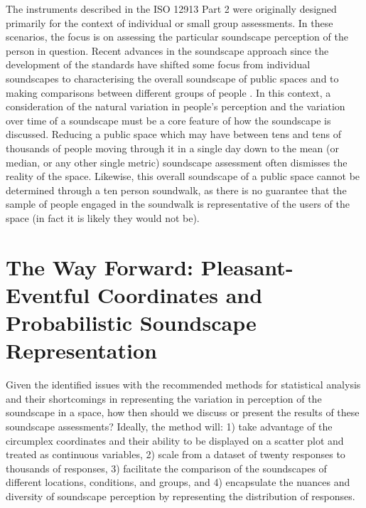 \documentclass[
  authoryear,
  preprint,
  3p]{elsarticle}
\begin{document}
The instruments described in the ISO 12913 Part 2 \citep{ISO12913_2}
were originally designed primarily for the context of individual or
small group assessments. In these scenarios, the focus is on assessing
the particular soundscape perception of the person in question. Recent
advances in the soundscape approach since the development of the
standards have shifted some focus from individual soundscapes to
characterising the overall soundscape of public spaces
\citep{Mitchell2020Protocol} and to making comparisons between different
groups of people \citep{Jeon2018cross}. In this context, a consideration
of the natural variation in people's perception and the variation over
time of a soundscape must be a core feature of how the soundscape is
discussed. Reducing a public space which may have between tens and tens
of thousands of people moving through it in a single day down to the
mean (or median, or any other single metric) soundscape assessment often
dismisses the reality of the space. Likewise, this overall soundscape of
a public space cannot be determined through a ten person soundwalk, as
there is no guarantee that the sample of people engaged in the soundwalk
is representative of the users of the space (in fact it is likely they
would not be).

\section{The Way Forward: Pleasant-Eventful Coordinates and
Probabilistic Soundscape
Representation}\label{the-way-forward-pleasant-eventful-coordinates-and-probabilistic-soundscape-representation}

Given the identified issues with the recommended methods for statistical
analysis and their shortcomings in representing the variation in
perception of the soundscape in a space, how then should we discuss or
present the results of these soundscape assessments? Ideally, the method
will: 1) take advantage of the circumplex coordinates and their ability
to be displayed on a scatter plot and treated as continuous variables,
2) scale from a dataset of twenty responses to thousands of responses,
3) facilitate the comparison of the soundscapes of different locations,
conditions, and groups, and 4) encapsulate the nuances and diversity of
soundscape perception by representing the distribution of responses.
\end{document}
